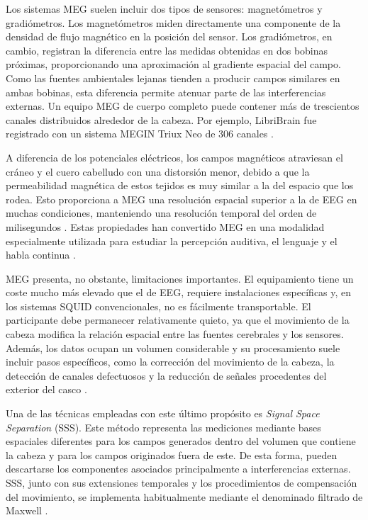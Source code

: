 Los sistemas MEG suelen incluir dos tipos de sensores: magnetómetros y gradiómetros. Los magnetómetros miden directamente una componente de la densidad de flujo magnético en la posición del sensor. Los gradiómetros, en cambio, registran la diferencia entre las medidas obtenidas en dos bobinas próximas, proporcionando una aproximación al gradiente espacial del campo. Como las fuentes ambientales lejanas tienden a producir campos similares en ambas bobinas, esta diferencia permite atenuar parte de las interferencias externas. Un equipo MEG de cuerpo completo puede contener más de trescientos canales distribuidos alrededor de la cabeza. Por ejemplo, LibriBrain fue registrado con un sistema MEGIN Triux Neo de 306 canales \cite{ozdogan2025libribrain}.

A diferencia de los potenciales eléctricos, los campos magnéticos atraviesan el cráneo y el cuero cabelludo con una distorsión menor, debido a que la permeabilidad magnética de estos tejidos es muy similar a la del espacio que los rodea. Esto proporciona a MEG una resolución espacial superior a la de EEG en muchas condiciones, manteniendo una resolución temporal del orden de milisegundos \cite{hamalainen1993meg,gross2013meg}. Estas propiedades han convertido MEG en una modalidad especialmente utilizada para estudiar la percepción auditiva, el lenguaje y el habla continua \cite{dash2020megphrases}.

MEG presenta, no obstante, limitaciones importantes. El equipamiento tiene un coste mucho más elevado que el de EEG, requiere instalaciones específicas y, en los sistemas SQUID convencionales, no es fácilmente transportable. El participante debe permanecer relativamente quieto, ya que el movimiento de la cabeza modifica la relación espacial entre las fuentes cerebrales y los sensores. Además, los datos ocupan un volumen considerable y su procesamiento suele incluir pasos específicos, como la corrección del movimiento de la cabeza, la detección de canales defectuosos y la reducción de señales procedentes del exterior del casco \cite{gross2013meg}.

Una de las técnicas empleadas con este último propósito es \textit{Signal Space Separation} (SSS). Este método representa las mediciones mediante bases espaciales diferentes para los campos generados dentro del volumen que contiene la cabeza y para los campos originados fuera de este. De esta forma, pueden descartarse los componentes asociados principalmente a interferencias externas. SSS, junto con sus extensiones temporales y los procedimientos de compensación del movimiento, se implementa habitualmente mediante el denominado filtrado de Maxwell \cite{taulu2005sss}.

